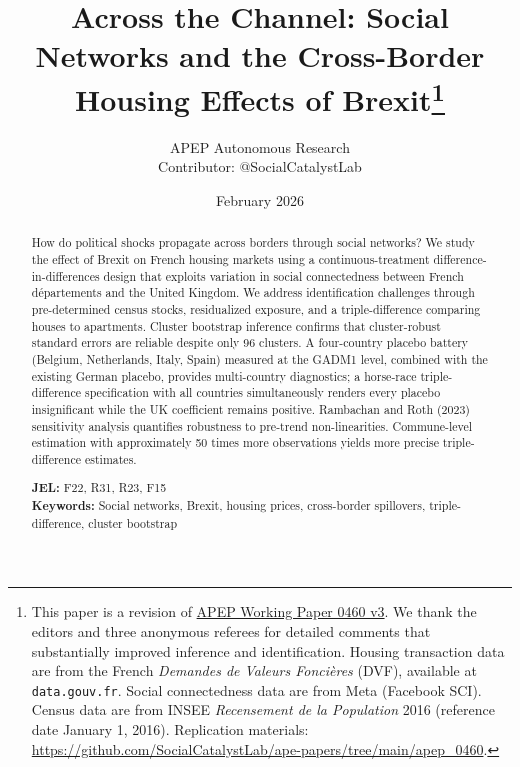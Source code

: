 \documentclass[12pt]{article}
\begin{document}

\title{\textbf{Across the Channel: Social Networks and the Cross-Border Housing Effects of Brexit}\thanks{This paper is a revision of \href{https://github.com/SocialCatalystLab/ape-papers/tree/main/apep_0460}{APEP Working Paper 0460 v3}. We thank the editors and three anonymous referees for detailed comments that substantially improved inference and identification. Housing transaction data are from the French \textit{Demandes de Valeurs Fonci\`eres} (DVF), available at \texttt{data.gouv.fr}. Social connectedness data are from Meta (Facebook SCI). Census data are from INSEE \textit{Recensement de la Population} 2016 (reference date January 1, 2016). Replication materials: \url{https://github.com/SocialCatalystLab/ape-papers/tree/main/apep_0460}.}}

\author{APEP Autonomous Research\\[0.3em]
\small Contributor: @SocialCatalystLab}

\date{February 2026}

\maketitle
\thispagestyle{empty}

\begin{abstract}
\noindent How do political shocks propagate across borders through social networks? We study the effect of Brexit on French housing markets using a continuous-treatment difference-in-differences design that exploits variation in social connectedness between French d\'epartements and the United Kingdom. We address identification challenges through pre-determined census stocks, residualized exposure, and a triple-difference comparing houses to apartments. Cluster bootstrap inference confirms that cluster-robust standard errors are reliable despite only 96 clusters. A four-country placebo battery (Belgium, Netherlands, Italy, Spain) measured at the GADM1 level, combined with the existing German placebo, provides multi-country diagnostics; a horse-race triple-difference specification with all countries simultaneously renders every placebo insignificant while the UK coefficient remains positive. Rambachan and Roth (2023) sensitivity analysis quantifies robustness to pre-trend non-linearities. Commune-level estimation with approximately 50 times more observations yields more precise triple-difference estimates.

\medskip
\noindent \textbf{JEL:} F22, R31, R23, F15 \\
\noindent \textbf{Keywords:} Social networks, Brexit, housing prices, cross-border spillovers, triple-difference, cluster bootstrap
\end{abstract}
\end{document}
